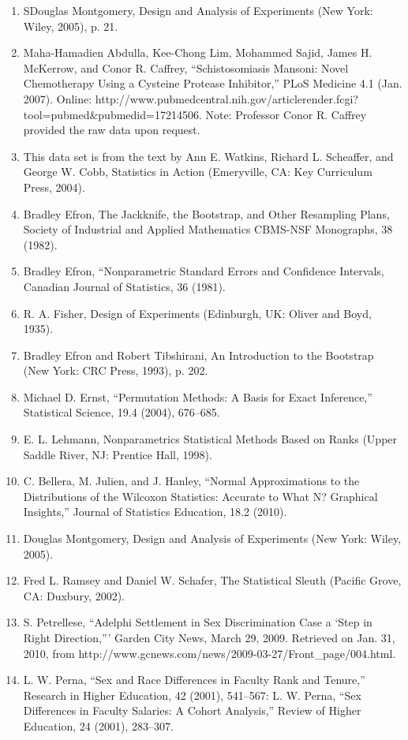 \documentclass[
]{book}
\begin{document}
\begin{enumerate}

\item SDouglas Montgomery, Design and Analysis of Experiments (New York: Wiley, 2005), p. 21.
\item Maha-Hamadien Abdulla, Kee-Chong Lim, Mohammed Sajid, James H. McKerrow, and Conor R. Caffrey, “Schistosomiasis
Mansoni: Novel Chemotherapy Using a Cysteine Protease Inhibitor,” PLoS Medicine 4.1 (Jan. 2007).
Online: http://www.pubmedcentral.nih.gov/articlerender.fcgi?tool=pubmed&pubmedid=17214506. Note: Professor
Conor R. Caffrey provided the raw data upon request.
\item This data set is from the text by Ann E. Watkins, Richard L. Scheaffer, and George W. Cobb, Statistics in Action
(Emeryville, CA: Key Curriculum Press, 2004).
\item Bradley Efron, The Jackknife, the Bootstrap, and Other Resampling Plans, Society of Industrial and Applied Mathematics
CBMS-NSF Monographs, 38 (1982).
\item Bradley Efron, “Nonparametric Standard Errors and Confidence Intervals, Canadian Journal of Statistics, 36 (1981).
\item R. A. Fisher, Design of Experiments (Edinburgh, UK: Oliver and Boyd, 1935).
\item Bradley Efron and Robert Tibshirani, An Introduction to the Bootstrap (New York: CRC Press, 1993), p. 202.
\item Michael D. Ernst, “Permutation Methods: A Basis for Exact Inference,” Statistical Science, 19.4 (2004), 676–685.
\item E. L. Lehmann, Nonparametrics Statistical Methods Based on Ranks (Upper Saddle River, NJ: Prentice Hall, 1998).
\item C. Bellera, M. Julien, and J. Hanley, “Normal Approximations to the Distributions of the Wilcoxon Statistics: Accurate
to What N? Graphical Insights,” Journal of Statistics Education, 18.2 (2010).
\item Douglas Montgomery, Design and Analysis of Experiments (New York: Wiley, 2005).
\item Fred L. Ramsey and Daniel W. Schafer, The Statistical Sleuth (Pacific Grove, CA: Duxbury, 2002).
\item S. Petrellese, “Adelphi Settlement in Sex Discrimination Case a ‘Step in Right Direction,”’ Garden City News,
March 29, 2009. Retrieved on Jan. 31, 2010, from http://www.gcnews.com/news/2009-03-27/Front_page/004.html.
\item L. W. Perna, “Sex and Race Differences in Faculty Rank and Tenure,” Research in Higher Education, 42 (2001),
541–567: L. W. Perna, “Sex Differences in Faculty Salaries: A Cohort Analysis,” Review of Higher Education, 24
(2001), 283–307.

\end{enumerate}
\end{document}
